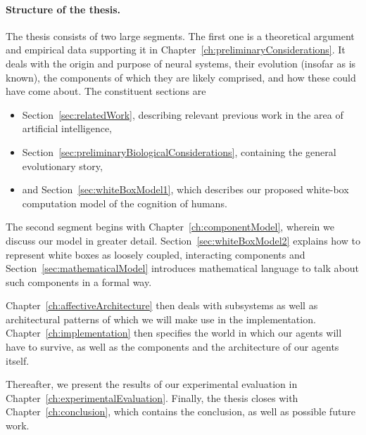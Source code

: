 \paragraph{Structure of the thesis.} The thesis consists of two large segments. The first one is a theoretical argument and empirical data supporting it in Chapter~\ref{ch:preliminaryConsiderations}. It deals with the origin and purpose of neural systems, their evolution (insofar as is known), the components of which they are likely comprised, and how these could have come about. The constituent sections are
	\begin{itemize}
		\item Section~\ref{sec:relatedWork}, describing relevant previous work in the area of artificial intelligence,
		\item Section~\ref{sec:preliminaryBiologicalConsiderations}, containing the general evolutionary story,
		\item and Section~\ref{sec:whiteBoxModel1}, which describes our proposed white-box computation model of the cognition of humans.
	\end{itemize}

The second segment begins with Chapter~\ref{ch:componentModel}, wherein we discuss our model in greater detail. Section~\ref{sec:whiteBoxModel2} explains how to represent white boxes as loosely coupled, interacting components and Section~\ref{sec:mathematicalModel} introduces mathematical language to talk about such components in a formal way.

Chapter~\ref{ch:affectiveArchitecture} then deals with subsystems as well as architectural patterns of which we will make use in the implementation. Chapter~\ref{ch:implementation} then specifies the world in which our agents will have to survive, as well as the components and the architecture of our agents itself.

Thereafter, we present the results of our experimental evaluation in Chapter~\ref{ch:experimentalEvaluation}. Finally, the thesis closes with Chapter~\ref{ch:conclusion}, which contains the conclusion, as well as possible future work.




